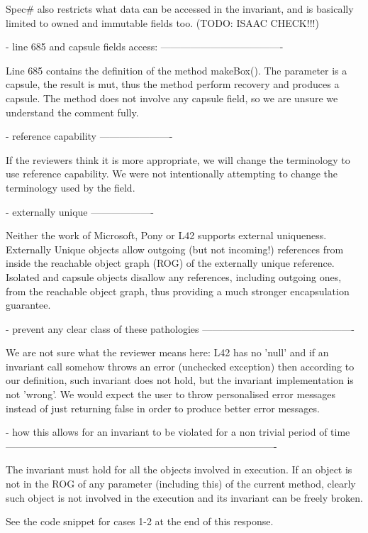 Spec# also restricts what data can be accessed in the invariant, and is basically limited
to owned and immutable fields too. (TODO: ISAAC CHECK!!!)

- line 685 and capsule fields access:
-------------------------------------

Line 685 contains the definition of the method makeBox().
The parameter is a capsule, the result is mut, thus the method perform recovery and produces a capsule.
The method does not involve any capsule field, so we are unsure we understand the comment fully.

- reference capability
----------------------

If the reviewers think it is more appropriate, we will change the terminology to use reference capability.
We were not intentionally attempting to change the terminology used by the field.

- externally unique
-------------------

Neither the work of Microsoft, Pony or L42 supports external uniqueness.
Externally Unique objects allow outgoing (but not incoming!) references from inside the reachable object graph (ROG)
of the externally unique reference.
Isolated and capsule objects disallow any references, including outgoing ones, from the reachable object graph,
thus providing a much stronger encapsulation guarantee.

- prevent any clear class of these pathologies
----------------------------------------------

We are not sure what the reviewer means here: L42 has no 'null' and if an invariant call
somehow throws an error (unchecked exception) then according to our definition, such invariant does
not hold, but the invariant implementation is not 'wrong'. We would expect the user to 
throw personalised error messages instead of just returning false in order to produce better error messages.

- how this allows for an invariant to be violated for a non trivial period of time
----------------------------------------------------------------------------------

The invariant must hold for all the objects involved in execution.
If an object is not in the ROG of any parameter (including this) of the current method,
clearly such object is not involved in the execution and its invariant can be freely broken.

See the code snippet for cases 1-2 at the end of this response.

